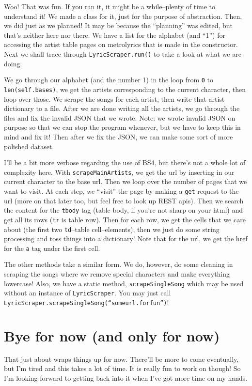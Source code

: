 \documentclass[11pt, twoside, reqno]{book}
\begin{document}
Woo! That was fun. If you ran it, it might be a while--plenty of time to understand it! We made a class for it, just for the purpose of abstraction. Then, we did just as we planned! It may be because the ``planning'' was edited, but that's neither here nor there. We have a list for the alphabet (and ``1'') for accessing the artist table pages on metrolyrics that is made in the constructor. Next we shall trace through \texttt{LyricScraper.run()} to take a look at what we are doing.

We go through our alphabet (and the number 1) in the loop from \texttt{0} to \texttt{len(self.bases)}, we get the artists corresponding to the current character, then loop over those. We scrape the songs for each artist, then write that artist dictionary to a file. After we are done writing all the artists, we go through the files and fix the invalid JSON that we wrote. Note: we wrote invalid JSON on purpose so that we can stop the program whenever, but we have to keep this in mind and fix it! Then after we fix the JSON, we can make some sort of more polished dataset.

I'll be a bit more verbose regarding the use of BS4, but there's not a whole lot of complexity here. With \texttt{scrapeMainArtists}, we get the url by inserting in our current character to the base url. Then we loop over the number of pages that we want to visit. At each step, we ``visit'' the page by making a \texttt{get} request to the url (more on that later too, but feel free to look up REST apis). Then we search the content for the \texttt{tbody} tag (table body, if you're not sharp on your html) and get all its rows (\texttt{tr} is table row). Then for each row, we get the cells that we care about (the first two \texttt{td}--table cell--elements), then we just do some string processing and toss things into a dictionary! Note that for the url, we get the href for the \texttt{a} tag under the first cell.

The other methods take a similar form. We do, however, do some cleaning in scraping the songs where we remove special characters and make everything lowercase! Also, we have a static method, \texttt{scrapeSingleSong} which may be used without an instance of \texttt{LyricScraper}. You may just call \texttt{LyricScraper.scrapeSingleSong(``someurl.forfun'')}!

\section{Bye for now (and only for now)}

That just about wraps things up for now. There'll be more to come eventually, but I'm tired and this takes a lot of time. It is really fun to work on though! So I'm looking forward to getting back into it when I've got more time on my hands.
\end{document}
